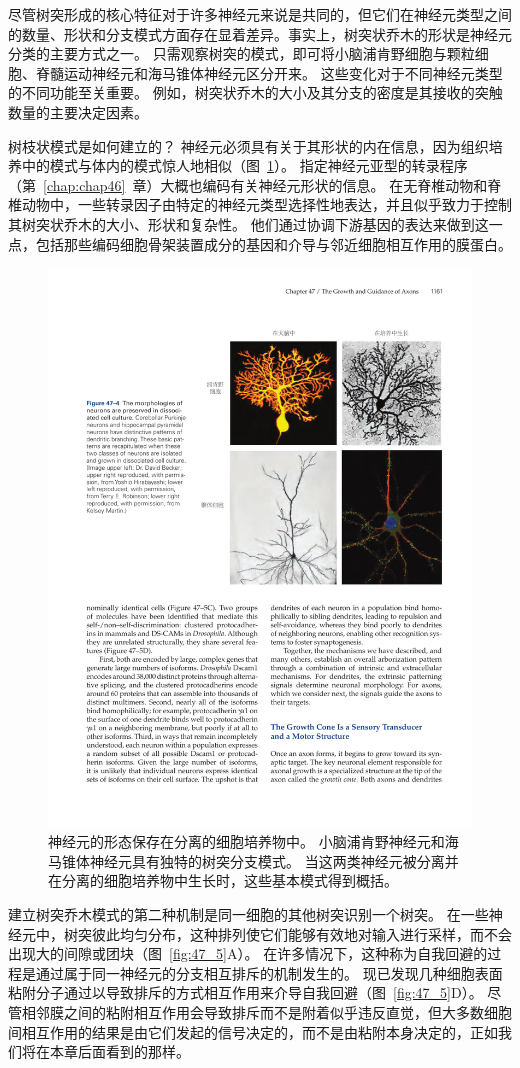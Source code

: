尽管树突形成的核心特征对于许多神经元来说是共同的，但它们在神经元类型之间的数量、形状和分支模式方面存在显着差异。事实上，树突状乔木的形状是神经元分类的主要方式之一。
只需观察树突的模式，即可将小脑浦肯野细胞与颗粒细胞、脊髓运动神经元和海马锥体神经元区分开来。
这些变化对于不同神经元类型的不同功能至关重要。
例如，树突状乔木的大小及其分支的密度是其接收的突触数量的主要决定因素。


树枝状模式是如何建立的？
神经元必须具有关于其形状的内在信息，因为组织培养中的模式与体内的模式惊人地相似（图~\ref{fig:47_4}）。
指定神经元亚型的转录程序（第~\ref{chap:chap46}~章）大概也编码有关神经元形状的信息。
在无脊椎动物和脊椎动物中，一些转录因子由特定的神经元类型选择性地表达，并且似乎致力于控制其树突状乔木的大小、形状和复杂性。
他们通过协调下游基因的表达来做到这一点，包括那些编码细胞骨架装置成分的基因和介导与邻近细胞相互作用的膜蛋白。


\begin{figure}[htbp]
	\centering
	\includegraphics[width=0.75\linewidth]{chap47/fig_47_4}
	\caption{神经元的形态保存在分离的细胞培养物中。
		小脑浦肯野神经元和海马锥体神经元具有独特的树突分支模式。
		当这两类神经元被分离并在分离的细胞培养物中生长时，这些基本模式得到概括。}
	\label{fig:47_4}
\end{figure}


建立树突乔木模式的第二种机制是同一细胞的其他树突识别一个树突。
在一些神经元中，树突彼此均匀分布，这种排列使它们能够有效地对输入进行采样，而不会出现大的间隙或团块（图~\ref{fig:47_5}A）。
在许多情况下，这种称为自我回避的过程是通过属于同一神经元的分支相互排斥的机制发生的。
现已发现几种细胞表面粘附分子通过以导致排斥的方式相互作用来介导自我回避（图~\ref{fig:47_5}D）。
尽管相邻膜之间的粘附相互作用会导致排斥而不是附着似乎违反直觉，但大多数细胞间相互作用的结果是由它们发起的信号决定的，而不是由粘附本身决定的，正如我们将在本章后面看到的那样。


